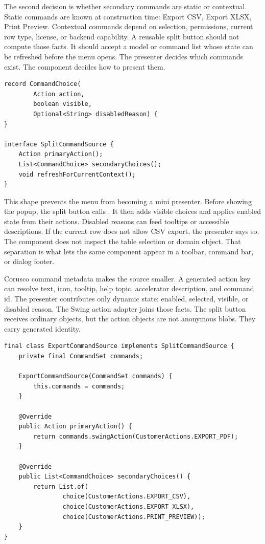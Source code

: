 The second decision is whether secondary commands are static or contextual. Static
commands are known at construction time: Export CSV, Export XLSX, Print Preview.
Contextual commands depend on selection, permissions, current row type, license, or
backend capability. A reusable split button should not compute those facts. It should
accept a model or command list whose state can be refreshed before the menu opens. The
presenter decides which commands exist. The component decides how to present them.

\begin{lstlisting}[caption={A contextual split-button model exposes command availability.}]
record CommandChoice(
        Action action,
        boolean visible,
        Optional<String> disabledReason) {
}

interface SplitCommandSource {
    Action primaryAction();
    List<CommandChoice> secondaryChoices();
    void refreshForCurrentContext();
}
\end{lstlisting}

This shape prevents the menu from becoming a mini presenter. Before showing the popup,
the split button calls
. It
then adds visible choices and applies enabled state from their actions. Disabled reasons
can feed tooltips or accessible descriptions. If the current row does not allow CSV
export, the presenter says so. The component does not inspect the table selection or
domain object. That separation is what lets the same component appear in a toolbar,
command bar, or dialog footer.

Corusco command metadata makes the source smaller. A generated action key can resolve
text, icon, tooltip, help topic, accelerator description, and command id. The presenter
contributes only dynamic state: enabled, selected, visible, or disabled reason. The
Swing action adapter joins those facts. The split button receives ordinary 
objects, but the action objects are not anonymous blobs. They carry generated identity.

\begin{lstlisting}[caption={A Corusco-backed command source keeps dynamic state small.}]
final class ExportCommandSource implements SplitCommandSource {
    private final CommandSet commands;

    ExportCommandSource(CommandSet commands) {
        this.commands = commands;
    }

    @Override
    public Action primaryAction() {
        return commands.swingAction(CustomerActions.EXPORT_PDF);
    }

    @Override
    public List<CommandChoice> secondaryChoices() {
        return List.of(
                choice(CustomerActions.EXPORT_CSV),
                choice(CustomerActions.EXPORT_XLSX),
                choice(CustomerActions.PRINT_PREVIEW));
    }
}
\end{lstlisting}

